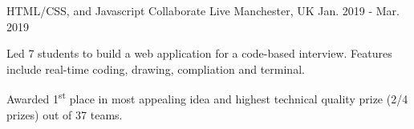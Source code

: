 \begin{cventries}
  \cventry
    {HTML/CSS, and Javascript} %
    {Collaborate Live} %
    {Manchester, UK} %
    {Jan. 2019 - Mar. 2019} %
    {
      \begin{cvitems} %
        \item {Led 7 students to build a web application for a code-based interview. Features include real-time coding, drawing, compliation and terminal.}
        \item {Awarded 1\textsuperscript{st} place in most appealing idea and highest technical quality prize (2/4 prizes) out of 37 teams.}
      \end{cvitems}
    }
    





\end{cventries}
